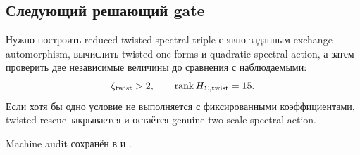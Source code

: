 \subsection{Следующий решающий gate}

Нужно построить reduced twisted spectral triple с явно заданным exchange
automorphism, вычислить twisted one-forms и quadratic spectral action, а
затем проверить две независимые величины до сравнения с наблюдаемыми:
\begin{equation}
 \zeta_{\rm twist}>2,
 \qquad
 \operatorname{rank} H_{\Sigma,\rm twist}=15.
 \label{eq:ps-twisted-next-pass}
\end{equation}
Если хотя бы одно условие не выполняется с фиксированными коэффициентами,
twisted rescue закрывается и остаётся genuine two-scale spectral action.

Machine audit сохранён в
 и
.
